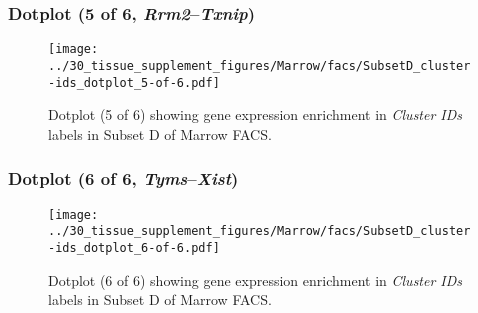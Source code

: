 \clearpage

\subsubsection{Dotplot (5 of 6, \emph{Rrm2}--\emph{Txnip})}
\begin{figure}[h]
\centering
\texttt{[image: ../30\_tissue\_supplement\_figures/Marrow/facs/SubsetD\_cluster-ids\_dotplot\_5-of-6.pdf]}

\caption{ Dotplot (5 of 6)  showing gene expression enrichment in \emph{Cluster IDs} labels in Subset D of Marrow FACS. }
\end{figure}


\clearpage

\subsubsection{Dotplot (6 of 6, \emph{Tyms}--\emph{Xist})}
\begin{figure}[h]
\centering
\texttt{[image: ../30\_tissue\_supplement\_figures/Marrow/facs/SubsetD\_cluster-ids\_dotplot\_6-of-6.pdf]}

\caption{ Dotplot (6 of 6)  showing gene expression enrichment in \emph{Cluster IDs} labels in Subset D of Marrow FACS. }
\end{figure}


